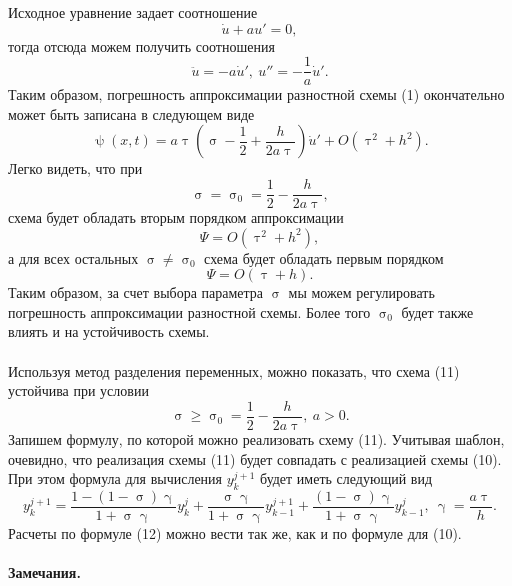 \documentclass[a4paper, 12pt]{report}
\numberwithin{equation}{section}
\renewcommand{\geq}{\geqslant}
\renewcommand{\gamma}{\upgamma}
\renewcommand{\tau}{\uptau}
\renewcommand{\sigma}{\upsigma}
\renewcommand{\psi}{\uppsi}
\begin{document}
	Исходное уравнение задает соотношение
	$$\dot u + a u ' = 0,$$
	тогда отсюда можем получить соотношения
	$$\ddot u = -a \dot u',\ u'' = -\dfrac 1 a \dot u '.$$
	Таким образом, погрешность аппроксимации разностной схемы (1) окончательно может быть записана в следующем виде
	$$\psi(x,t) = a\tau \left(\sigma - \dfrac 12 + \dfrac{h}{2a\tau}\right)\dot u ' + O(\tau^2 + h^2).$$
	Легко видеть, что при 
	$$\sigma = \sigma_0 = \dfrac 12 - \dfrac{h}{2a\tau},$$
	схема будет обладать вторым порядком аппроксимации
	$$\Psi = O(\tau^2 + h^2),$$
	а для всех остальных $\sigma \ne \sigma_0$ схема будет обладать первым порядком
	$$\Psi = O(\tau + h).$$
	Таким образом, за счет выбора параметра $\sigma$ мы можем регулировать погрешность аппроксимации разностной схемы. Более того $\sigma_0$ будет также влиять и на устойчивость схемы. \\\\
	Используя метод разделения переменных, можно показать, что схема (11) устойчива при условии $$\sigma \geq \sigma_0 = \dfrac 12 - \dfrac{h}{2a\tau},\ a > 0.$$
	Запишем формулу, по которой можно реализовать схему (11). Учитывая шаблон, очевидно, что реализация схемы (11) будет совпадать с реализацией схемы (10). При этом формула для вычисления $y_k^{j+1}$ будет иметь следующий вид
	\begin{equation}
		y_k^{j+1} = \dfrac{1 - (1-\sigma)\gamma}{1 + \sigma \gamma} y_k^j + \dfrac{\sigma \gamma}{1+\sigma \gamma} y_{k-1}^{j+1} + \dfrac{(1-\sigma)\gamma}{1+\sigma \gamma}y_{k-1}^j,\ \gamma = \dfrac{a\tau}{h}.
	\end{equation}
	Расчеты по формуле (12) можно вести так же, как и по формуле для (10).
	\\\\
	\textbf{Замечания.}
\end{document}
